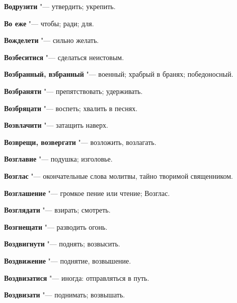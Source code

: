 \begin{mymulticols}{2}
\noindent\textbf{Водрузити} "--- утвердить; укрепить. 




\noindent\textbf{Во еже} "--- чтобы; ради; для. 




\noindent\textbf{Вожделети} "--- сильно желать. 




\noindent\textbf{Возбеситися} "--- сделаться неистовым. 




\noindent\textbf{Возбранный, взбранный} "--- военный; храбрый в бранях; победоносный. 




\noindent\textbf{Возбраняти} "--- препятствовать; удерживать. 




\noindent\textbf{Возбряцати} "--- воспеть; хвалить в песнях. 




\noindent\textbf{Возвлачити} "--- затащить наверх. 




\noindent\textbf{Возврещи, возвергати} "--- возложить, возлагать. 




\noindent\textbf{Возглавие} "--- подушка; изголовье. 




\noindent\textbf{Возглас} "--- окончательные слова молитвы, тайно творимой священником. 




\noindent\textbf{Возглашение} "--- громкое пение или чтение; Возглас. 




\noindent\textbf{Возглядати} "--- взирать; смотреть. 




\noindent\textbf{Возгнещати} "--- разводить огонь. 




\noindent\textbf{Воздвигнути} "--- поднять; возвысить. 




\noindent\textbf{Воздвижение} "--- поднятие, возвышение. 




\noindent\textbf{Воздвизатися} "--- иногда: отправляться в путь. 




\noindent\textbf{Воздвизати} "--- поднимать; возвышать. 





\end{mymulticols}
